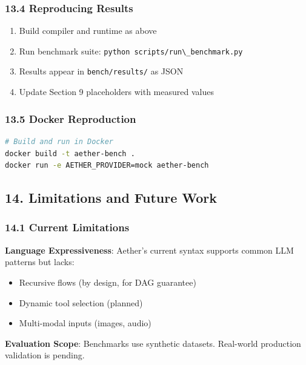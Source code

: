 \documentclass[
]{article}
\newcommand{\passthrough}[1]{#1}
\providecommand{\tightlist}{%
  \setlength{\itemsep}{0pt}\setlength{\parskip}{0pt}}
\begin{document}
\subsubsection{13.4 Reproducing Results}\label{reproducing-results}

\begin{enumerate}
\def\labelenumi{\arabic{enumi}.}
\tightlist
\item
  Build compiler and runtime as above
\item
  Run benchmark suite:
  \passthrough{\lstinline!python scripts/run\_benchmark.py!}
\item
  Results appear in \passthrough{\lstinline!bench/results/!} as JSON
\item
  Update Section 9 placeholders with measured values
\end{enumerate}

\subsubsection{13.5 Docker Reproduction}\label{docker-reproduction}

\begin{lstlisting}[language=bash]
# Build and run in Docker
docker build -t aether-bench .
docker run -e AETHER_PROVIDER=mock aether-bench
\end{lstlisting}

\subsection{14. Limitations and Future
Work}\label{limitations-and-future-work}

\subsubsection{14.1 Current Limitations}\label{current-limitations}

\textbf{Language Expressiveness}: Aether's current syntax supports
common LLM patterns but lacks:

\begin{itemize}
\tightlist
\item
  Recursive flows (by design, for DAG guarantee)
\item
  Dynamic tool selection (planned)
\item
  Multi-modal inputs (images, audio)
\end{itemize}

\textbf{Evaluation Scope}: Benchmarks use synthetic datasets. Real-world
production validation is pending.
\end{document}
